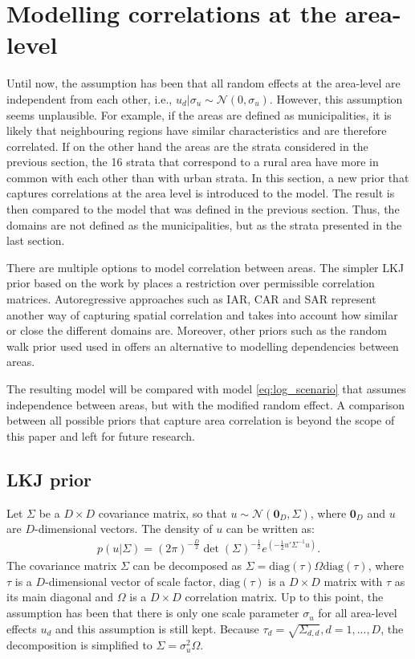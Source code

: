 \section{Modelling correlations at the area-level}
\label{ch:area_corr}

Until now, the assumption has been that all random effects at the area-level are independent from each other, i.e., $u_d|\sigma_u \sim \mathcal N (0, \sigma_u)$.
However, this assumption seems unplausible.
For example, if the areas are defined as municipalities, it is likely that neighbouring regions have similar characteristics and are therefore correlated.
If on the other hand the areas are the strata considered in the previous section, the 16 strata that correspond to a rural area have more in common with each other than with urban strata.
In this section, a new prior that captures correlations at the area level is introduced to the model.
The result is then compared to the model that was defined in the previous section.
Thus, the domains are not defined as the municipalities, but as the strata presented in the last section.

There are multiple options to model correlation between areas.
The simpler LKJ prior based on the work by \cite{lewandowski_generating_2009} places a restriction over permissible correlation matrices.
Autoregressive approaches such as IAR, CAR and SAR \citep{chung_bayesian_2020} represent another way of capturing spatial correlation and takes into account how similar or close the different domains are.
Moreover, other priors such as the random walk prior used used in \cite{gao_improving_2021} offers an alternative to modelling dependencies between areas.

The resulting model will be compared with model \ref{eq:log_scenario} that assumes independence between areas, but with the modified random effect.
A comparison between all possible priors that capture area correlation is beyond the scope of this paper and left for future research.

\subsection{LKJ prior}

Let $\Sigma$ be a $D \times D$ covariance matrix, so that $u \sim \mathcal{N}(\boldsymbol{0}_D, \Sigma)$, where $\boldsymbol 0_D$ and $u$ are $D$-dimensional vectors.
The density of $u$ can be written as:
\begin{gather*}
    p(u|\Sigma) = (2\pi)^{-\frac D 2}\det(\Sigma)^{-\frac 1 2} e^{(-\frac 1 2 u'\Sigma^{-1} u)}.
\end{gather*}
The covariance matrix $\Sigma$ can be decomposed as $\Sigma = \text{diag}(\tau)\Omega\text{diag}(\tau)$, where $\tau$ is a $D$-dimensional vector of scale factor, $\text{diag}(\tau)$ is a $D \times D$ matrix with $\tau$ as its main diagonal and $\Omega$ is a $D \times D$ correlation matrix.
Up to this point, the assumption has been that there is only one scale parameter $\sigma_u$ for all area-level effects $u_d$ and this assumption is still kept.
Because $\tau_d = \sqrt{\Sigma_{d, d}}, d = 1, ..., D$, the decomposition is simplified to $\Sigma = \sigma_u^2 \Omega$.


